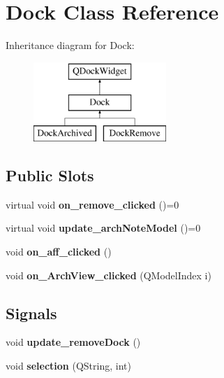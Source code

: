 \hypertarget{class_dock}{}\section{Dock Class Reference}
\label{class_dock}
Inheritance diagram for Dock\+:\begin{figure}[H]
\begin{center}
\leavevmode
\includegraphics[height=3.000000cm]{class_dock}
\end{center}
\end{figure}
\subsection*{Public Slots}
\begin{DoxyCompactItemize}
\item 
\mbox{\label{class_dock_a74bd1a9145a04fe37c1c97bedd7c460d}} 
virtual void {\bfseries on\+\_\+remove\+\_\+clicked} ()=0
\item 
\mbox{\label{class_dock_aba7e136be0e7bbff8cf76369e10982c0}} 
virtual void {\bfseries update\+\_\+arch\+Note\+Model} ()=0
\item 
\mbox{\label{class_dock_a162f55159baba3ad2f485c1cbfb67fe2}} 
void {\bfseries on\+\_\+aff\+\_\+clicked} ()
\item 
\mbox{\label{class_dock_a88d9948db78eddd5551bb47e4cb63277}} 
void {\bfseries on\+\_\+\+Arch\+View\+\_\+clicked} (Q\+Model\+Index i)
\end{DoxyCompactItemize}
\subsection*{Signals}
\begin{DoxyCompactItemize}
\item 
\mbox{\label{class_dock_aca603632e4561e582254273c234d97a8}} 
void {\bfseries update\+\_\+remove\+Dock} ()
\item 
\mbox{\label{class_dock_a8abd37c4496e6c548ecb4ecb685679a1}} 
void {\bfseries selection} (Q\+String, int)
\end{DoxyCompactItemize}
